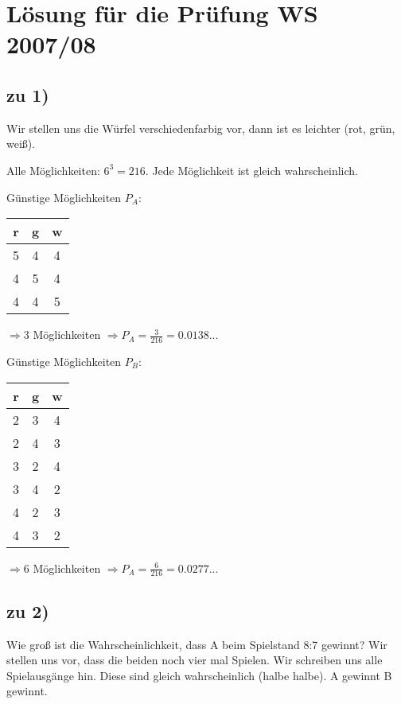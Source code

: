 \renewcommand{\ldate}{2016-01-12}



\section{Lösung für die Prüfung WS 2007/08}

\subsection{zu 1)}
Wir stellen uns die Würfel verschiedenfarbig vor, dann ist es leichter (rot, grün, weiß). 

Alle Möglichkeiten: $ 6^3 = 216 $. Jede Möglichkeit ist gleich wahrscheinlich.

Günstige Möglichkeiten $P_A$: 

\begin{tabular}{|c|c|c|}
\hline r & g & w \\ 
\hline 5 & 4 & 4 \\ 
\hline 4 & 5 & 4 \\ 
\hline 4 & 4 & 5 \\ 
\hline 
\end{tabular}  
$\Rightarrow 3$ Möglichkeiten
$\Rightarrow P_A = \frac{3}{216} = 0.0138...$

Günstige Möglichkeiten $P_B$: 

\begin{tabular}{|c|c|c|}
\hline r & g & w \\ 
\hline 2 & 3 & 4 \\ 
\hline 2 & 4 & 3 \\ 
\hline 3 & 2 & 4 \\ 
\hline 3 & 4 & 2 \\ 
\hline 4 & 2 & 3 \\ 
\hline 4 & 3 & 2 \\ 
\hline 
\end{tabular}  
$\Rightarrow 6$ Möglichkeiten
$\Rightarrow P_A = \frac{6}{216} = 0.0277...$

\subsection{zu 2)}
Wie groß ist die Wahrscheinlichkeit, dass A beim Spielstand 8:7 gewinnt? Wir stellen uns vor, dass die beiden noch vier mal Spielen. Wir schreiben uns alle Spielausgänge hin. Diese sind gleich wahrscheinlich (halbe halbe). \color{red} A gewinnt \color{blue} B gewinnt. 


